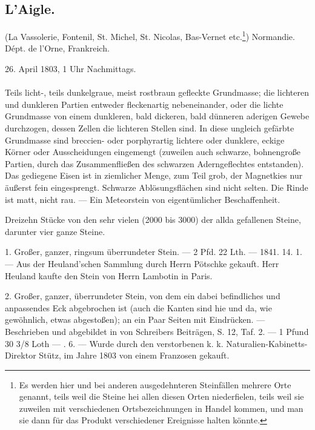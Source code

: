 \documentclass[a4paper, 11pt, oneside, polutonikogreek, german]{article}
\begin{document}
\subsection{L'Aigle.}
\begin{center}
\small
(La Vassolerie, Fontenil, St. Michel, St. Nicolas, Bas-Vernet etc.\footnote{Es werden hier und bei anderen ausgedehnteren Steinfällen mehrere Orte genannt, teils weil die Steine hei allen diesen Orten niederfielen, teils weil sie zuweilen mit verschiedenen Ortsbezeichnungen in Handel kommen, und man sie dann für das Produkt verschiedener Ereignisse halten könnte.}) Normandie. Dépt. de l'Orne, Frankreich.

26. April 1803, 1 Uhr Nachmittags.
\end{center}
\paragraph{}
Teils licht-, teils dunkelgraue, meist rostbraun gefleckte Grundmasse; die lichteren und dunkleren Partien entweder fleckenartig nebeneinander, oder die lichte Grundmasse von einem dunkleren, bald dickeren, bald dünneren aderigen Gewebe durchzogen, dessen Zellen die lichteren Stellen sind. In diese ungleich gefärbte Grundmasse sind breccien- oder porphyrartig lichtere oder dunklere, eckige Körner oder Ausscheidungen eingemengt (zuweilen auch schwarze, bohnengroße Partien, durch das Zusammenfließen des schwarzen Aderngeflechtes entstanden). Das gediegene Eisen ist in ziemlicher Menge, zum Teil grob, der Magnetkies nur äußerst fein eingesprengt. Schwarze Ablösungsflächen sind nicht selten. Die Rinde ist matt, nicht rau. — Ein Meteorstein von eigentümlicher Beschaffenheit.

Dreizehn Stücke von den sehr vielen (2000 bis 3000) der allda gefallenen Steine, darunter vier ganze Steine.

1. Großer, ganzer, ringsum überrundeter Stein. — 2 Pfd. 22 Lth. — 1841. 14. 1. — Aus der Heuland'schen Sammlung durch Herrn Pötschke gekauft. Herr Heuland kaufte den Stein von Herrn Lambotin in Paris.

2. Großer, ganzer, überrundeter Stein, von dem ein dabei befindliches und anpassendes Eck abgebrochen ist (auch die Kanten sind hie und da, wie gewöhnlich, etwas abgestoßen); an ein Paar Seiten mit Eindrücken. — Beschrieben und abgebildet in von Schreibers Beiträgen, S. 12, Taf. 2. — 1 Pfund 30 3/8 Loth — . 6. — Wurde durch den verstorbenen k. k. Naturalien-Kabinetts-Direktor Stütz, im Jahre 1803 von einem Franzosen gekauft.
\end{document}
